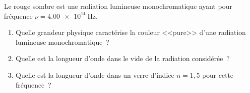 Le rouge sombre est une radiation lumineuse monochromatique ayant pour fréquence
$\nu=\qty{4.00e14}{\Hz}$.
\begin{enumerate}
    \item Quelle grandeur physique caractérise la couleur <<pure>> d'une
          radiation lumineuse monochromatique~?
    \item Quelle est la longueur d'onde dans le vide de la radiation
          considérée~?
    \item Quelle est la longueur d'onde dans un verre d'indice $n=1,5$ pour
          cette fréquence~?
\end{enumerate}

